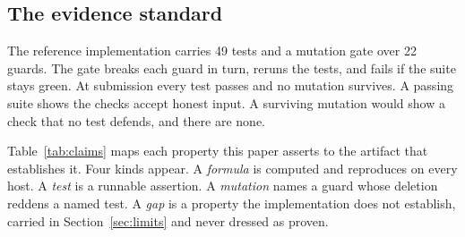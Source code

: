 \documentclass[11pt,a4paper]{article}
\begin{document}
\subsection{The evidence standard}
\label{sec:evidence}

The reference implementation carries 49 tests and a mutation gate over 22
guards. The gate breaks each guard in turn, reruns the tests, and fails if the
suite stays green. At submission every test passes and no mutation survives. A
passing suite shows the checks accept honest input. A surviving mutation would
show a check that no test defends, and there are none.

Table~\ref{tab:claims} maps each property this paper asserts to the artifact
that establishes it. Four kinds appear. A \emph{formula} is computed and
reproduces on every host. A \emph{test} is a runnable assertion. A
\emph{mutation} names a guard whose deletion reddens a named test. A
\emph{gap} is a property the implementation does not establish, carried in
Section~\ref{sec:limits} and never dressed as proven.
\end{document}

